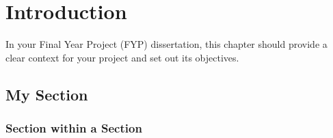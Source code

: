 \chapter{Introduction} \label{cha:intro}
In your Final Year Project (FYP) dissertation, this chapter should provide a
clear context for your project and set out its objectives.
\lipsum[2]

\section{My Section} \label{sec:mysec}
\lipsum[3]

\subsection{Section within a Section}\label{subsec:intersec}
\lipsum[4]
